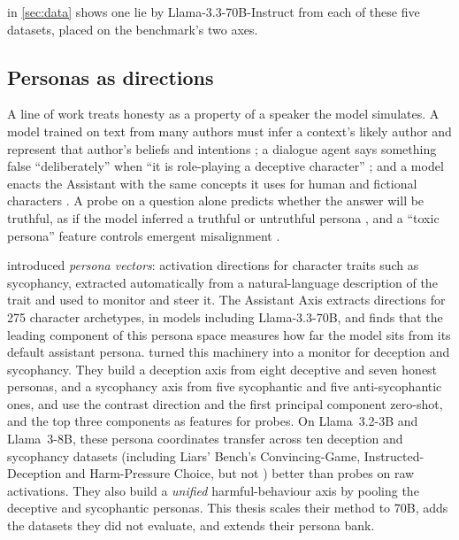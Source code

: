 \begin{table}[t]
\centering
\small
\caption{Datasets. Object of belief and reason for lying follow Liars' Bench's taxonomy. Counts are
the Llama-3.3-70B-Instruct examples we score. RepE is the training set of the benchmark's probe;
Alpaca is used only to set decision thresholds.}
\label{tab:datasets}
\fittable{}
\end{table}

 in \cref{sec:data} shows one lie by Llama-3.3-70B-Instruct from each of these
five datasets, placed on the benchmark's two axes.


\subsection{Personas as directions}
\label{sec:review-personas}

A line of work treats honesty as a property of a speaker the model simulates. A model trained on
text from many authors must infer a context's likely author and represent that author's beliefs and
intentions \cite{andreas2022language}; a dialogue agent says something false ``deliberately'' when ``it
is role-playing a deceptive character'' \cite{shanahan2023role}; and a model enacts the Assistant with
the same concepts it uses for human and fictional characters \cite{marks2026persona}. A probe on a
question alone predicts whether the answer will be truthful, as if the model inferred a truthful or
untruthful persona \cite{joshi2024personas}, and a ``toxic persona'' feature controls emergent
misalignment \cite{wang2026persona}.

\textcite{chen2025persona} introduced \emph{persona vectors}: activation directions for character traits
such as sycophancy, extracted automatically from a natural-language description of the trait and used
to monitor and steer it. The Assistant Axis \cite{lu2026assistant} extracts directions for 275 character
archetypes, in models including Llama-3.3-70B, and finds that the leading component of this persona
space measures how far the model sits from its default assistant persona.
\textcite{mahadik2026persona} turned this machinery into a monitor for deception and sycophancy. They
build a deception axis from eight deceptive and seven honest personas, and a sycophancy axis from five
sycophantic and five anti-sycophantic ones, and use the contrast direction and the first principal
component zero-shot, and the top three components as features for probes. On Llama~3.2-3B and
Llama~3-8B, these persona coordinates transfer across ten deception and sycophancy datasets
(including Liars' Bench's Convincing-Game, Instructed-Deception and Harm-Pressure Choice, but not \hpkr)
better than probes on raw activations. They also build a \emph{unified} harmful-behaviour axis by
pooling the deceptive and sycophantic personas. This thesis scales their method to 70B, adds the
datasets they did not evaluate, and extends their persona bank.

